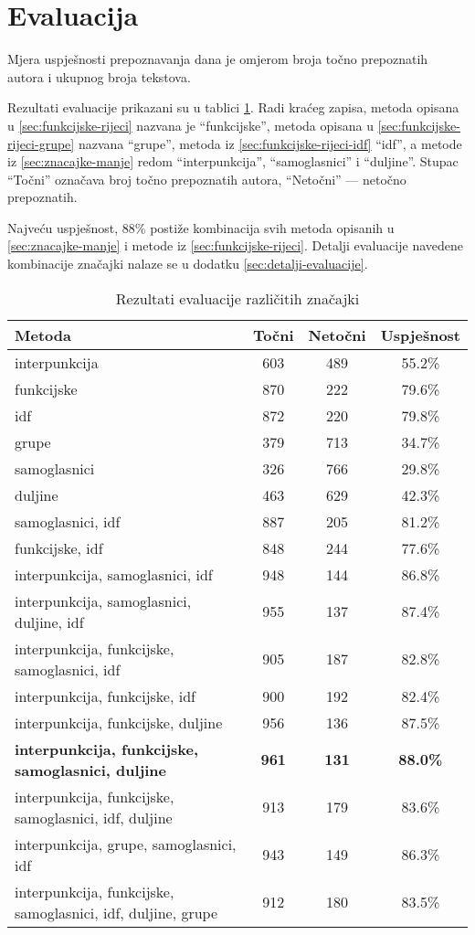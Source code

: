 \documentclass{article}
\begin{document}
\section{Evaluacija}
\label{sec:evaluacija}
Mjera uspješnosti prepoznavanja dana je omjerom broja točno prepoznatih autora
i ukupnog broja tekstova.

Rezultati evaluacije prikazani su u tablici \ref{tbl:eval}. Radi kraćeg zapisa,
metoda opisana u \ref{sec:funkcijske-rijeci} nazvana je ``funkcijske'', metoda
opisana u \ref{sec:funkcijske-rijeci-grupe} nazvana ``grupe'',
metoda iz \ref{sec:funkcijske-rijeci-idf} ``idf'', a metode iz
\ref{sec:znacajke-manje} redom ``interpunkcija'', ``samoglasnici'' i
``duljine''. Stupac ``Točni'' označava broj točno prepoznatih autora,
``Netočni'' --- netočno prepoznatih.

Najveću uspješnost, 88\% postiže kombinacija svih metoda opisanih u
\ref{sec:znacajke-manje} i metode iz \ref{sec:funkcijske-rijeci}. Detalji
evaluacije navedene kombinacije značajki nalaze se u dodatku
\ref{sec:detalji-evaluacije}.

\begin{table}[ht]
\caption{Rezultati evaluacije različitih značajki}
\centering
\begin{tabular}{p{6cm} c c c}
\hline\hline
Metoda & Točni & Netočni & Uspješnost \\
[0.5ex]
\hline
interpunkcija & 603 & 489 & 55.2\% \\
funkcijske & 870 & 222 & 79.6\% \\
idf & 872 & 220 & 79.8\% \\
grupe & 379 & 713 & 34.7\% \\
samoglasnici & 326 & 766 & 29.8\% \\
duljine & 463 & 629 & 42.3\% \\
samoglasnici, idf & 887 & 205 & 81.2\% \\
funkcijske, idf & 848 & 244 & 77.6\% \\
interpunkcija, samoglasnici, idf & 948 & 144 & 86.8\% \\
interpunkcija, samoglasnici, duljine, idf & 955 & 137 & 87.4\% \\
interpunkcija, funkcijske, samoglasnici, idf & 905 & 187 & 82.8\% \\
interpunkcija, funkcijske, idf & 900 & 192 & 82.4\% \\
interpunkcija, funkcijske, duljine & 956 & 136 & 87.5\% \\
\textbf{interpunkcija, funkcijske, samoglasnici, duljine} & \textbf{961} & \textbf{131} & \textbf{88.0\%} \\
interpunkcija, funkcijske, samoglasnici, idf, duljine & 913 & 179 & 83.6\% \\
interpunkcija, grupe, samoglasnici, idf & 943 & 149 & 86.3\% \\
interpunkcija, funkcijske, samoglasnici, idf, duljine, grupe & 912 & 180 & 83.5\% \\ [1ex]
\hline
\end{tabular}
\label{tbl:eval}
\end{table}
\end{document}
